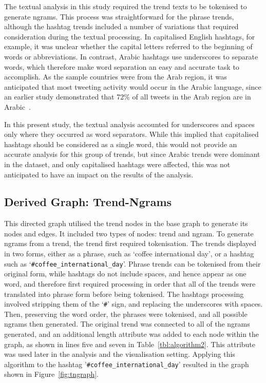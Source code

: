 \documentclass[conference]{IEEEtran}
\begin{document}
The textual analysis in
this study required the trend texts to be tokenised to generate
ngrams. This process was straightforward for the phrase trends,
although the hashtag trends included a number of variations that
required consideration during the textual processing. In capitalised
English hashtags, for example, it was unclear whether the capital
letters referred to the beginning of words or abbreviations. In
contrast, Arabic hashtags use underscores to separate words, which
therefore make word separation an easy and accurate task to
accomplish. As the sample countries were from the Arab region, it was
anticipated that most tweeting activity would occur in the Arabic
language, since an earlier study demonstrated that 72\% of all tweets
in the Arab region are in Arabic~\cite{Salem2017}.

In this present study, the textual analysis accounted for underscores
and spaces only where they occurred as word separators. While this
implied that capitalised hashtags should be considered as a single
word, this would not provide an accurate analysis for this group of
trends, but since Arabic trends were dominant in the dataset, and only
capitalised hashtags were affected, this was not anticipated to have
an impact on the results of the analysis.


\subsection{Derived Graph: Trend-Ngrams}

This directed graph utilised the trend nodes in the base graph to
generate its nodes and edges. It included two types of nodes: trend
and ngram. To generate ngrams from a trend, the trend first required
tokenisation. The trends displayed in two forms, either as a phrase,
such as `coffee international day', or a hashtag such as
`{\texttt{\#coffee\_international\_day}}'.  Phrase trends can be
tokenised from their original form, while hashtags do not include
spaces, and hence appear as one word, and therefore first required
processing in order that all of the trends were translated into phrase
form before being tokenised. The hashtags processing involved
stripping them of the `{\texttt{\#}}' sign, and replacing the underscores with
spaces. Then, preserving the word order, the phrases were tokenised,
and all possible ngrams then generated.  The original trend was
connected to all of the ngrams generated, and an additional length
attribute was added to each node within the graph, as shown in lines
five and seven in Table~\ref{tbl:algorithm2}. 
This attribute was used later in the
analysis and the visualisation setting. Applying this algorithm to the
hashtag '{\texttt{\#coffee\_international\_day}}' resulted in the
graph shown in Figure~\ref{fig:tngraph}.
\end{document}
